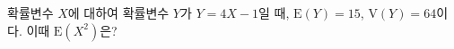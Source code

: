 확률변수 $X$에 대하여 확률변수 $Y$가 $Y=4X-1$일 때, $\mathrm{E}(Y)=15$, $\mathrm{V}(Y)=64$이다. 이때 $\mathrm{E}(X^2)$은?
